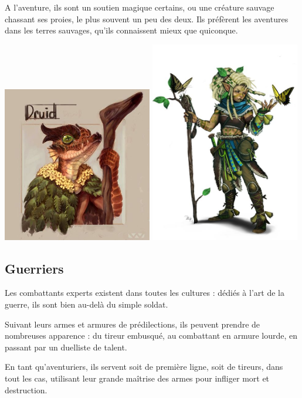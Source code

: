 \documentclass[10pt,a4paper]{book}
\begin{document}
A l'aventure, ils sont un soutien magique certains, ou une créature sauvage chassant ses proies, le plus souvent un peu des deux. Ils préfèrent les aventures dans les terres sauvages, qu'ils connaissent mieux que quiconque.

\includegraphics[width=0.49\textwidth]{druide 1}
\includegraphics[width=0.49\textwidth]{druide 2}
\subsection{Guerriers}
Les combattants experts existent dans toutes les cultures : dédiés à l'art de la guerre, ils sont bien au-delà du simple soldat.

Suivant leurs armes et armures de prédilections, ils peuvent prendre de nombreuses apparence : du tireur embusqué, au combattant en armure lourde, en passant par un duelliste de talent.

En tant qu'aventuriers, ils servent soit de première ligne, soit de tireurs, dans tout les cas, utilisant leur grande maîtrise des armes pour infliger mort et destruction.
\end{document}

